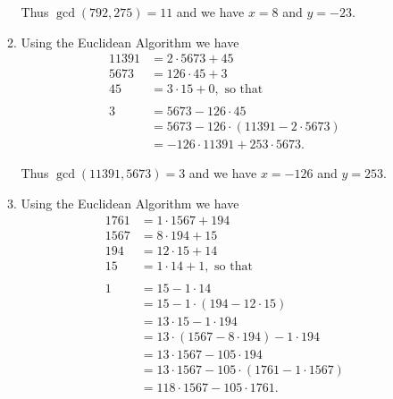 \begin{enumerate}
\begin{enumerate}
               Thus $\gcd(792, 275) = 11$ and we have $x = 8$ and $y = -23$.
         \item Using the Euclidean Algorithm we have
               \begin{align*}
                  11391 &= 2 \cdot 5673 + 45 \\
                  5673  &= 126 \cdot 45 + 3 \\
                  45    &= 3 \cdot 15 + 0, \text{ so that } \\ \\
                  3     &= 5673 - 126 \cdot 45 \\
                        &= 5673 - 126 \cdot (11391 - 2 \cdot 5673) \\
                        &= -126 \cdot 11391 + 253 \cdot 5673.
               \end{align*}

               Thus $\gcd(11391, 5673) = 3$ and we have $x = -126$ and
               $y = 253$.
         \item Using the Euclidean Algorithm we have
               \begin{align*}
                  1761 &= 1 \cdot 1567 + 194 \\
                  1567 &= 8 \cdot 194 + 15 \\
                  194  &= 12 \cdot 15 + 14 \\
                  15   &= 1 \cdot 14 + 1, \text{ so that } \\ \\
                   1   &= 15 - 1 \cdot 14 \\
                       &= 15 - 1 \cdot (194 - 12 \cdot 15) \\
                       &= 13 \cdot 15 - 1 \cdot 194 \\
                       &= 13 \cdot (1567 - 8 \cdot 194) - 1 \cdot 194 \\
                       &= 13 \cdot 1567 - 105 \cdot 194 \\
                       &= 13 \cdot 1567 - 105 \cdot (1761 - 1 \cdot 1567) \\
                       &= 118 \cdot 1567 - 105 \cdot 1761.
               \end{align*}


\end{enumerate}
\end{enumerate}
